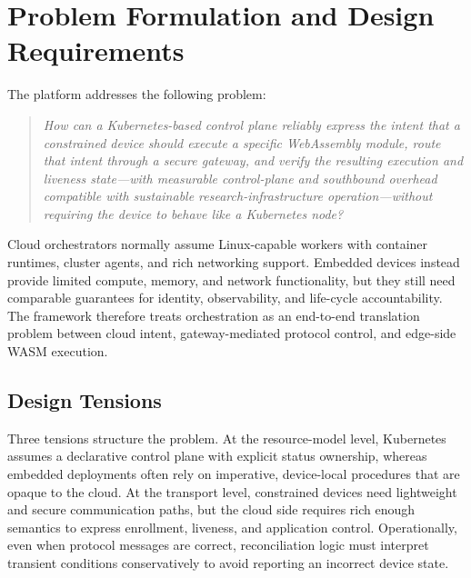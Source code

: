 \section{Problem Formulation and Design Requirements}\label{sec:problem}

The platform addresses the following problem:
\begin{quote}
\emph{How can a Kubernetes-based control plane reliably express the intent that a constrained device should execute a specific WebAssembly module, route that intent through a secure gateway, and verify the resulting execution and liveness state---with measurable control-plane and southbound overhead compatible with sustainable research-infrastructure operation---without requiring the device to behave like a Kubernetes node?}
\end{quote}

Cloud orchestrators normally assume Linux-capable workers with container runtimes, cluster agents, and rich networking support. Embedded devices instead provide limited compute, memory, and network functionality, but they still need comparable guarantees for identity, observability, and life-cycle accountability. The framework therefore treats orchestration as an end-to-end translation problem between cloud intent, gateway-mediated protocol control, and edge-side WASM execution.

\subsection{Design Tensions}
Three tensions structure the problem. At the resource-model level, Kubernetes assumes a declarative control plane with explicit status ownership, whereas embedded deployments often rely on imperative, device-local procedures that are opaque to the cloud. At the transport level, constrained devices need lightweight and secure communication paths, but the cloud side requires rich enough semantics to express enrollment, liveness, and application control. Operationally, even when protocol messages are correct, reconciliation logic must interpret transient conditions conservatively to avoid reporting an incorrect device state.


